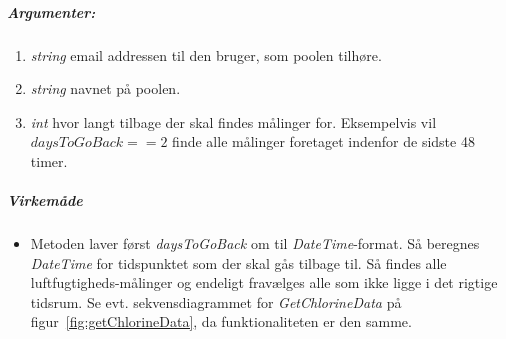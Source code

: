 \subparagraph{Argumenter:}
\begin{enumerate}
	\item \textit{string} email addressen til den bruger, som poolen tilhøre.
	\item \textit{string} navnet på poolen.
	\item \textit{int} hvor langt tilbage der skal findes målinger for. Eksempelvis vil $daysToGoBack == 2$ finde alle målinger foretaget indenfor de sidste 48 timer.
\end{enumerate}

\subparagraph{Virkemåde}
\begin{itemize}
	\item Metoden laver først \textit{daysToGoBack} om til \textit{DateTime}-format. Så beregnes \textit{DateTime} for tidspunktet som der skal gås tilbage til. Så findes alle luftfugtigheds-målinger og endeligt fravælges alle som ikke ligge i det rigtige tidsrum. Se evt. sekvensdiagrammet for \textit{GetChlorineData} på figur~\ref{fig:getChlorineData}, da funktionaliteten er den samme.
\end{itemize}
